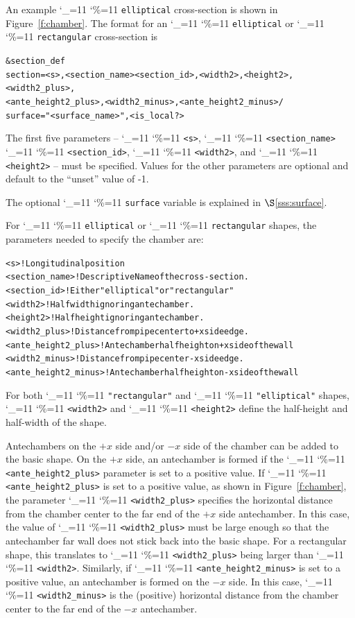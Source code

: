 \documentclass[11pt]{article}
\newcommand{\sref}[1]{$\S$\ref{#1}}
\newcommand\ttcmd{\begingroup\catcode`\_=11 \catcode`\%=11 \dottcmd}
\newcommand\dottcmd[1]{\texttt{#1}\endgroup}
\newcommand{\fig}[1]{Figure~\ref{#1}}
\newcommand{\vn}{\ttcmd}
\newlength{\ExBeg}
\newlength{\ExEnd}
\newenvironment{example}
  {\vspace{\ExBeg} \begin{alltt}}
  {\end{alltt} \vspace{\ExEnd}}
\begin{document}
An example \vn{elliptical} cross-section is shown in
\fig{f:chamber}. The format for an \vn{elliptical} or \vn{rectangular}
cross-section is
\begin{example}
  &section_def 
    section = <s>, <section_name> <section_id>, <width2>, <height2>, <width2_plus>, 
              <ante_height2_plus>, <width2_minus>, <ante_height2_minus> /
    surface = "<surface_name>", <is_local?>
\end{example}
The first five parameters -- \vn{<s>}, \vn{<section_name>}
\vn{<section_id>}, \vn{<width2>}, and \vn{<height2>} -- must be
specified. Values for the other parameters are optional and default to
the ``unset'' value of -1.

The optional \vn{surface} variable is explained in \sref{sss:surface}.

For \vn{elliptical} or \vn{rectangular} shapes, the
parameters needed to specify the chamber are:
\begin{example}
  <s>                   ! Longitudinal position
  <section_name>        ! Descriptive Name of the cross-section.
  <section_id>          ! Either "elliptical" or "rectangular"
  <width2>              ! Half width ignoring antechamber.
  <height2>             ! Half height ignoring antechamber.
  <width2_plus>         ! Distance from pipe center to +x side edge.
  <ante_height2_plus>   ! Antechamber half height on +x side of the wall
  <width2_minus>        ! Distance from pipe center -x side edge.
  <ante_height2_minus>  ! Antechamber half height on -x side of the wall
\end{example}

For both \vn{"rectangular"} and \vn{"elliptical"} shapes, \vn{<width2>}
and \vn{<height2>} define the half-height and half-width of the shape.

Antechambers on the $+x$ side and/or $-x$ side of the chamber can be
added to the basic shape. On the $+x$ side, an antechamber is formed
if the \vn{<ante_height2_plus>} parameter is set to a positive value. If
\vn{<ante_height2_plus>} is set to a positive value, as shown in
\fig{f:chamber}, the parameter \vn{<width2_plus>} specifies the
horizontal distance from the chamber center to the far end of the $+x$
side antechamber. In this case, the value of \vn{<width2_plus>} must be
large enough so that the antechamber far wall does not stick back into
the basic shape. For a rectangular shape, this translates to
\vn{<width2_plus>} being larger than \vn{<width2>}. Similarly, if
\vn{<ante_height2_minus>} is set to a positive value, an antechamber is
formed on the $-x$ side.  In this case, \vn{<width2_minus>} is the
(positive) horizontal distance from the chamber center to the far end
of the $-x$ antechamber.
\end{document}
